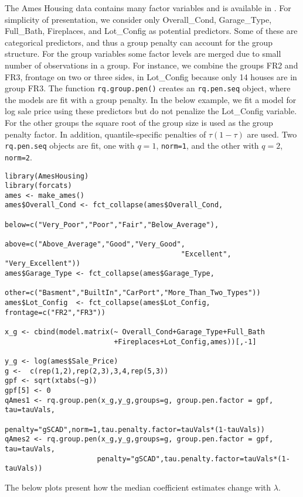 The Ames Housing data contains many factor variables and is available in . For simplicity of presentation, we consider only Overall\_Cond, Garage\_Type, Full\_Bath, Fireplaces, and Lot\_Config as potential predictors. Some of these are categorical predictors, and thus a group penalty can account for the group structure. For the group variables some factor levels are merged due to small number of observations in a group. For instance, we combine the groups FR2 and FR3, frontage on two or three sides, in Lot\_Config because only 14 houses are in group FR3. The function \texttt{rq.group.pen()} creates an \texttt{rq.pen.seq} object, where the models are fit with a group penalty. In the below example, we fit a model for log sale price using these predictors but do not penalize the Lot\_Config variable. For the other groups the square root of the group size is used as the group penalty factor. In addition, quantile-specific penalties of \(\tau(1-\tau)\) are used. Two \texttt{rq.pen.seq} objects are fit, one with \(q=1\), \texttt{norm=1}, and the other with \(q=2\), \texttt{norm=2}.

\begin{verbatim}
library(AmesHousing)
library(forcats)
ames <- make_ames()
ames$Overall_Cond <- fct_collapse(ames$Overall_Cond,
                                  below=c("Very_Poor","Poor","Fair","Below_Average"),
                                  above=c("Above_Average","Good","Very_Good",
                                          "Excellent", "Very_Excellent"))
ames$Garage_Type <- fct_collapse(ames$Garage_Type,
                      other=c("Basment","BuiltIn","CarPort","More_Than_Two_Types"))
ames$Lot_Config  <- fct_collapse(ames$Lot_Config, frontage=c("FR2","FR3"))

x_g <- cbind(model.matrix(~ Overall_Cond+Garage_Type+Full_Bath
                          +Fireplaces+Lot_Config,ames))[,-1]

y_g <- log(ames$Sale_Price)
g <-  c(rep(1,2),rep(2,3),3,4,rep(5,3))
gpf <- sqrt(xtabs(~g))
gpf[5] <- 0
qAmes1 <- rq.group.pen(x_g,y_g,groups=g, group.pen.factor = gpf, tau=tauVals,
                      penalty="gSCAD",norm=1,tau.penalty.factor=tauVals*(1-tauVals))
qAmes2 <- rq.group.pen(x_g,y_g,groups=g, group.pen.factor = gpf, tau=tauVals,
                      penalty="gSCAD",tau.penalty.factor=tauVals*(1-tauVals))
\end{verbatim}

The below plots present how the median coefficient estimates change with \(\lambda\).

